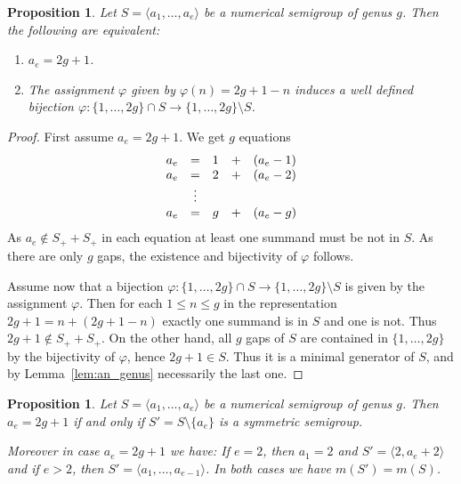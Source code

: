 \documentclass[a4paper,12pt,scrbook]{amsart}
\theoremstyle{plain}%
\newtheorem{proposition}[satz]{Proposition}
\theoremstyle{definition}
\begin{document}
\begin{proposition}\label{prop:ae_maximal} 
Let $S = \langle a_1, \ldots , a_e \rangle$ be a numerical 
semigroup of genus $g$. Then the following are equivalent: 
\begin{enumerate}
    	\item $a_e = 2g+1$.
    	\item The assignment $\varphi$ given by  $\varphi(n) = 2g+1 - n$ 
	induces a well defined bijection $\varphi: \{1, \ldots, 2g\} \cap S 
	\longrightarrow \{1, \ldots, 2g \} \setminus S$.   
\end{enumerate}
\end{proposition}

\begin{proof}
First assume $a_e = 2g+1$. We get $g$ equations 
	$$\begin{array} {l c l c l}
	a_e & = & 1 & + & (a_e - 1) \\
	a_e & = & 2 & + & (a_e - 2) \\
	& \vdots & & & \\
	a_e & = & g & + & (a_e - g) \\
	\end{array} $$
As $a_e \notin S_++S_+$ in each equation at least one 
summand must be not in $S$. 
As there are only $g$ gaps, the existence and bijectivity 
of $\varphi$ follows. 

Assume now that a 
bijection $\varphi: \{1, \ldots, 2g\} \cap S 
\longrightarrow \{1, \ldots, 2g \} \setminus S$
is given by the assignment $\varphi$. Then 
for each $1 \leq n \leq g$ in the representation 
$2g+1 = n + (2g+1-n)$ exactly 
one summand is in $S$ and one is not. Thus $2g+1 \notin 
S_+ + S_+$. On the other hand, all $g$ gaps of $S$ are 
contained in $\{1, \ldots, 2g\}$ by the bijectivity of 
$\varphi$, hence $2g+1 \in S$. Thus it is a minimal 
generator of $S$, and by Lemma~\ref{lem:an_genus} 
necessarily the last one. 
\end{proof}

\begin{proposition}\label{prop:an_alm_symm}
Let  $S = \langle a_1, \ldots, a_e\rangle$ be a numerical semigroup of genus $g$. Then 
$a_e = 2g+1$ if and only if $S' = S \setminus \{ a_e\}$ is a symmetric semigroup. 


Moreover in case $a_e = 2g+1$ we have: 
If $e=2$, then $a_1 = 2$ and $S' = \langle 2, a_e+2 \rangle$ and if 
$e > 2$, then $S' = \langle a_1, \ldots, a_{e-1}\rangle$. In both cases we have 
$m(S') = m(S)$. 
\end{proposition}
\end{document}
